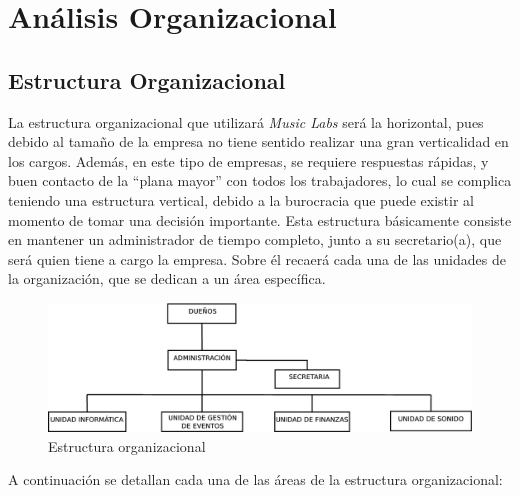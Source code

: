 \section{Análisis Organizacional}

\subsection{Estructura Organizacional}

La estructura organizacional que utilizará \emph{Music Labs}
será la horizontal, pues debido al tamaño de la empresa no tiene 
sentido realizar una gran verticalidad en los cargos. Además, en este 
tipo de empresas, se requiere respuestas rápidas, y buen contacto
de la ``plana mayor'' con todos los trabajadores, lo cual se complica 
teniendo una estructura vertical, debido a la burocracia que puede 
existir al momento de tomar una decisión importante. Esta estructura básicamente
consiste en mantener un administrador de tiempo completo, junto a su secretario(a), 
que será quien tiene a cargo la empresa. Sobre él recaerá cada una de las unidades 
de la organización, que se dedican a un área específica. 
\begin{figure}[h!t]
   \centering
  \includegraphics[scale=0.4]{img/estructuraorganizacional.png}
   \caption{Estructura organizacional}
   \label{fig:Estructura organizacional}
\end{figure}

A continuación se detallan cada una de las áreas de la estructura
organizacional:

